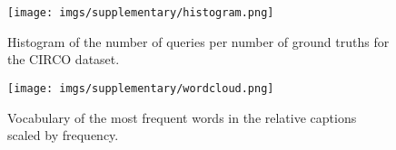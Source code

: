 \documentclass[10pt,twocolumn,letterpaper]{article}
\begin{document}
  \begin{figure}
     \centering
     \texttt{[image: imgs/supplementary/histogram.png]}
     \caption{Histogram of the number of queries per number of ground truths for the CIRCO dataset.}
     \label{fig:gt_histogram}
 \end{figure}


\begin{figure}
     \centering
     \texttt{[image: imgs/supplementary/wordcloud.png]}
     \caption{Vocabulary of the most frequent words in the relative captions scaled by frequency.}
     \label{fig:wordcloud}
 \end{figure}

 

 \begin{table}
     \centering
     \Large
   \caption{Analysis of the semantic aspects covered by the relative captions.  indicates results taken from \cite{liu2021image}. -- denotes no reported results.}
   \label{tab:caption_semantic}
 \end{table}
\end{document}
